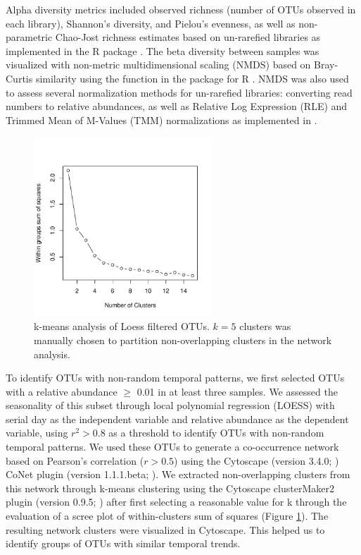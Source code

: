 Alpha diversity metrics included observed richness (number of OTUs observed in each library), Shannon's diversity, and Pielou's evenness, as well as non-parametric Chao-Jost richness estimates based on un-rarefied libraries as implemented in the R package  \citep{Chao2012-nw, chao2014rarefaction}. The beta diversity between samples was visualized with non-metric multidimensional scaling (NMDS) based on Bray-Curtis similarity using the  function in the  package for R \citep{Oksanen_2015}. NMDS was also used to assess several normalization methods for un-rarefied libraries: converting read numbers to relative abundances, as well as Relative Log Expression (RLE) and Trimmed Mean of M-Values (TMM) normalizations as implemented in  \citep{McMurdie2013-bb}.

\begin{figure}[ht] 
\centering 
\includegraphics[width=0.6\textwidth]{Chapter_3_SWI/Figures/Supplemental_Figure_1_k_selection}
\caption[Scree plot of number of k-means clusters versus within groups sum of squares.]{k-means analysis of Loess filtered OTUs. $k = 5$ clusters was manually chosen to partition non-overlapping clusters in the network analysis.} 
\label{fig:ch2:supp2_2} 
\end{figure}

To identify OTUs with non-random temporal patterns, we first selected OTUs with a relative abundance ${\geq}$ 0.01 in at least three samples. We assessed the seasonality of this subset through local polynomial regression (LOESS) with serial day as the independent variable and relative abundance as the dependent variable, using $r^{2} > 0.8$ as a threshold to identify OTUs with non-random temporal patterns. We used these OTUs to generate a co-occurrence network based on Pearson's correlation ($r > 0.5$) using the Cytoscape (version 3.4.0; \citealt{smobwr}) CoNet plugin (version 1.1.1.beta; \citealt{faust2012microbial}). We extracted non-overlapping clusters from this network through k-means clustering using the Cytoscape clusterMaker2 plugin (version 0.9.5; \citealt{morris2011clustermaker}) after first selecting a reasonable value for k through the evaluation of a scree plot of within-clusters sum of squares (Figure \ref{fig:ch2:supp2_2}). The resulting network clusters were visualized in Cytoscape. This helped us to identify groups of OTUs with similar temporal trends.


